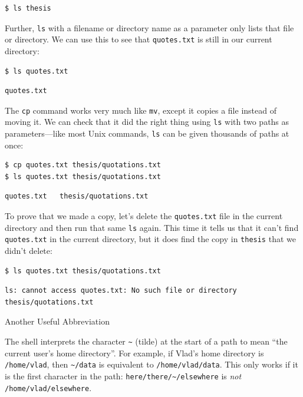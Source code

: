 \documentclass{book}
\begin{document}
\begin{verbatim}
$ ls thesis
\end{verbatim}

Further, \texttt{ls} with a filename or directory name as a parameter
only lists that file or directory. We can use this to see that
\texttt{quotes.txt} is still in our current directory:

\begin{verbatim}
$ ls quotes.txt
\end{verbatim}

\begin{verbatim}
quotes.txt
\end{verbatim}

The \texttt{cp} command works very much like \texttt{mv}, except it
copies a file instead of moving it. We can check that it did the right
thing using \texttt{ls} with two paths as parameters---like most Unix
commands, \texttt{ls} can be given thousands of paths at once:

\begin{verbatim}
$ cp quotes.txt thesis/quotations.txt
$ ls quotes.txt thesis/quotations.txt
\end{verbatim}

\begin{verbatim}
quotes.txt   thesis/quotations.txt
\end{verbatim}

To prove that we made a copy, let's delete the \texttt{quotes.txt} file
in the current directory and then run that same \texttt{ls} again. This
time it tells us that it can't find \texttt{quotes.txt} in the current
directory, but it does find the copy in \texttt{thesis} that we didn't
delete:

\begin{verbatim}
$ ls quotes.txt thesis/quotations.txt
\end{verbatim}

\begin{verbatim}
ls: cannot access quotes.txt: No such file or directory
thesis/quotations.txt
\end{verbatim}

\begin{swcbox}{Another Useful Abbreviation}

The shell interprets the character \texttt{\textasciitilde{}} (tilde) at
the start of a path to mean ``the current user's home directory''. For
example, if Vlad's home directory is \texttt{/home/vlad}, then
\texttt{\textasciitilde{}/data} is equivalent to
\texttt{/home/vlad/data}. This only works if it is the first character
in the path: \texttt{here/there/\textasciitilde{}/elsewhere} is
\emph{not} \texttt{/home/vlad/elsewhere}.

\end{swcbox}
\end{document}
